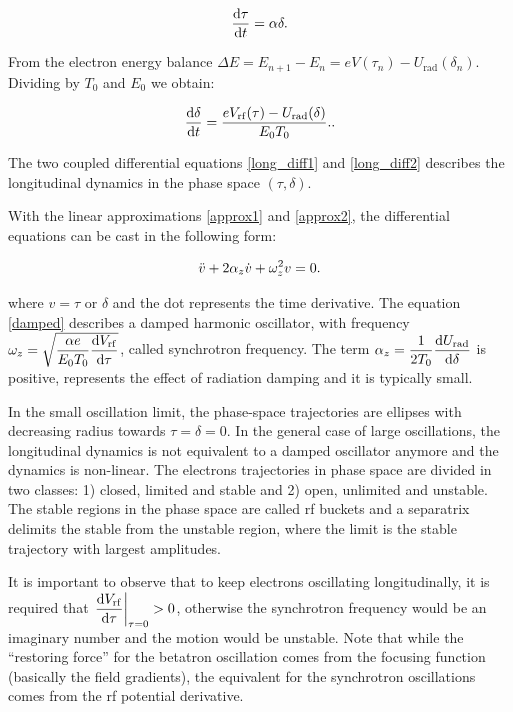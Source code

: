 \begin{equation}
\dfrac{\mathrm{d} \tau}{\mathrm{d} t} = \alpha \delta.
\label{long_diff1}
\end{equation}

From the electron energy balance $\Delta E = E_{n+1} - E_n = eV(\tau_n) - U_{\mathrm{rad}}(\delta_n)$. Dividing by $T_0$ and $E_0$ we obtain:

\begin{equation}
    \dfrac{\mathrm{d} \delta}{\mathrm{d} t} = \dfrac{eV_{\mathrm{rf}}(\tau) - U_{\mathrm{rad}}(\delta)}{E_0 T_0}.
    \label{long_diff2}.
\end{equation}

The two coupled differential equations \eqref{long_diff1} and \eqref{long_diff2} describes the longitudinal dynamics in the phase space $(\tau, \delta)$.

With the linear approximations \eqref{approx1} and \eqref{approx2}, the differential equations can be cast in the following form:

\begin{equation}
    \Ddot{v} + 2\alpha_{z} \dot{v} + \omega_{z}^2 v = 0.
    \label{damped}
\end{equation}

where $v=\tau$ or $\delta$ and the dot represents the time derivative. The equation \eqref{damped} describes a damped harmonic oscillator, with frequency $\omega_z = \sqrt{\dfrac{\alpha e}{E_0 T_0} \dfrac{\mathrm{d} V_{\mathrm{rf}}}{\mathrm{d} \tau}}$, called synchrotron frequency. The term $\alpha_z = \dfrac{1}{2T_0} \dfrac{\mathrm{d} U_{\mathrm{rad}}}{\mathrm{d} \delta}$ is positive, represents the effect of radiation damping and it is typically small. 

In the small oscillation limit, the phase-space trajectories are ellipses with decreasing radius towards $\tau = \delta = 0$. In the general case of large oscillations, the longitudinal dynamics is not equivalent to a damped oscillator anymore and the dynamics is non-linear. The electrons trajectories in phase space are divided in two classes: 1) closed, limited and stable and 2) open, unlimited and unstable. The stable regions in the phase space are called \gls{rf} buckets and a separatrix delimits the stable from the unstable region, where the limit is the stable trajectory with largest amplitudes.

It is important to observe that to keep electrons oscillating longitudinally, it is required that $\left.\dfrac{\mathrm{d} V_{\mathrm{rf}}}{\mathrm{d} \tau}\right|_{\tau = 0} > 0$, otherwise the synchrotron frequency would be an imaginary number and the motion would be unstable. Note that while the ``restoring force'' for the betatron oscillation comes from the focusing function (basically the field gradients), the equivalent for the synchrotron oscillations comes from the \gls{rf} potential derivative.

